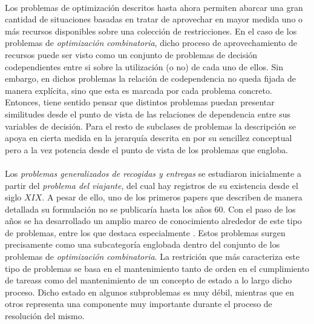 \documentclass{subfiles}
\begin{document}
        \paragraph{}
        Los problemas de optimización descritos hasta ahora permiten abarcar una gran cantidad de situaciones basadas en tratar de aprovechar en mayor medida uno o más recursos disponibles sobre una colección de restricciones. En el caso de los problemas de \emph{optimización combinatoria}, dicho proceso de aprovechamiento de recursos puede ser visto como un conjunto de problemas de decisión codependientes entre si sobre la utilización (o no) de cada uno de ellos. Sin embargo, en dichos problemas la relación de codependencia no queda fijada de manera explícita, sino que esta es marcada por cada problema concreto. Entonces, tiene sentido pensar que distintos problemas puedan presentar similitudes desde el punto de vista de las relaciones de dependencia entre sus variables de decisión. Para el resto de subclases de problemas la descripción se apoya en cierta medida en la jerarquía descrita en \cite{parragh2008survey} por su sencillez conceptual pero a la vez potencia desde el punto de vista de los problemas que engloba.

        \paragraph{}
        Los \emph{problemas generalizados de recogidas y entregas} se estudiaron inicialmente a partir del \emph{problema del viajante}, del cual hay registros de su existencia desde el siglo $XIX$. A pesar de ello, uno de los primeros papers que describen de manera detallada su formulación \cite{miller1960integer} no se publicaría hasta los años $60$. Con el paso de los años se ha desarrollado un amplio marco de conocimiento alrededor de este tipo de problemas, entre los que destaca especialmente \cite{toth2002vehicle}. Estos problemas surgen precisamente como una subcategoría englobada dentro del conjunto de los problemas de \emph{optimización combinatoria}. La restrición que más caracteriza este tipo de problemas se basa en el mantenimiento tanto de orden en el cumplimiento de tareass como del mantenimiento de un concepto de estado a lo largo dicho proceso. Dicho estado en algunos subproblemas es muy débil, mientras que en otros representa una componente muy importante durante el proceso de resolución del mismo.
\end{document}
